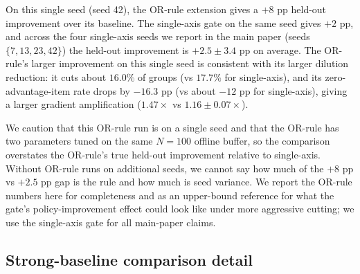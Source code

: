 \documentclass{article}
\begin{document}
On this single seed (seed 42), the OR-rule extension gives a
$+8$ pp held-out improvement over its baseline. The single-axis
gate on the same seed gives $+2$ pp, and across the four
single-axis seeds we report in the main paper (seeds
$\{7, 13, 23, 42\}$) the held-out improvement is
$+2.5\!\pm\!3.4$ pp on average. The OR-rule's larger improvement
on this single seed is consistent with its larger dilution
reduction: it cuts about $16.0\%$ of groups (vs $17.7\%$ for
single-axis), and its zero-advantage-item rate drops by $-16.3$
pp (vs about $-12$ pp for single-axis), giving a larger gradient
amplification ($1.47\times$ vs $1.16\!\pm\!0.07\times$).

We caution that this OR-rule run is on a single seed and that
the OR-rule has two parameters tuned on the same $N\!=\!100$
offline buffer, so the comparison overstates the OR-rule's true
held-out improvement relative to single-axis. Without OR-rule
runs on additional seeds, we cannot say how much of the
$+8$ pp vs $+2.5$ pp gap is the rule and how much is seed
variance. We report the OR-rule numbers here for completeness
and as an upper-bound reference for what the gate's
policy-improvement effect could look like under more aggressive
cutting; we use the single-axis gate for all main-paper claims.

\subsection{Strong-baseline comparison detail}
\label{app:strong_baselines_app}
\end{document}
